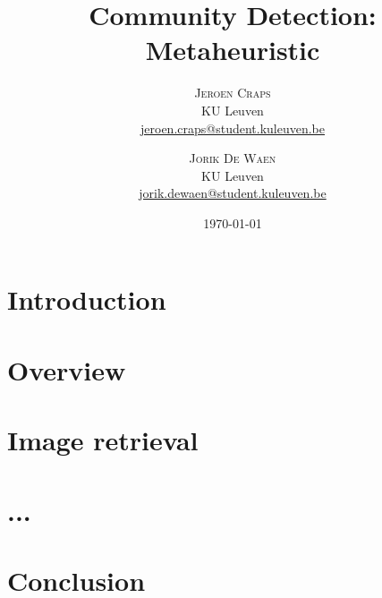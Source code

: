 \documentclass[twoside,twocolumn]{article}
\title{Community Detection: Metaheuristic} %
\author{%
\textsc{Jeroen Craps} \\[1ex] %
\normalsize KU Leuven \\ %
\normalsize \href{mailto:jeroen.craps@student.kuleuven.be}{jeroen.craps@student.kuleuven.be} %
\and %
\textsc{Jorik De Waen} \\[1ex] %
\normalsize KU Leuven \\ %
\normalsize \href{mailto:jorik.dewaen@student.kuleuven.be}{jorik.dewaen@student.kuleuven.be} %
}
\date{\today} %
\begin{document}



\section{Introduction}




\section{Overview}




\section{Image retrieval}


\section{...}


\section{Conclusion}







\end{document}
